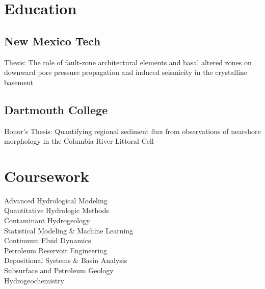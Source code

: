 \documentclass[]{deedy-resume-openfont}
\begin{document}
\lastupdated



%
%

\begin{minipage}[t]{0.33\textwidth}


\section{Education}

\subsection{New Mexico Tech}
Thesis: The role of fault-zone architectural elements and basal altered zones on downward pore pressure propagation and induced seismicity in the crystalline basement
\sectionsep

\subsection{Dartmouth College}
Honor's Thesis: Quantifying regional sediment flux from observations of nearshore morphology in the Columbia River Littoral Cell
\sectionsep



\section{Coursework}

Advanced Hydrological Modeling \\
Quantitative Hydrologic Methods \\
Contaminant Hydrogeology \\
Statistical Modeling \& Machine Learning \\
Continuum Fluid Dynamics \\
Petroleum Reservoir Engineering \\
Depositional Systems \& Basin Analysis \\
Subsurface and Petroleum Geology \\
Hydrogeochemistry \\
\sectionsep


\end{minipage}
\end{document}
